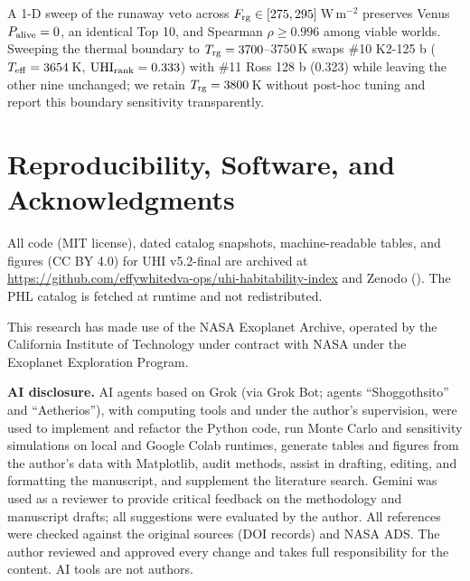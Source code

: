 \documentclass[linenumbers]{aastex702}
\begin{document}
A 1-D sweep of the runaway veto across $F_{\rm rg} \in [275, 295]$\,W\,m$^{-2}$ preserves Venus $P_{\rm alive} = 0$, an identical Top 10, and Spearman $\rho \geq 0.996$ among viable worlds. Sweeping the thermal boundary to $T_{\rm rg} = 3700$--$3750$\,K swaps \#10 K2-125 b ($T_{\rm eff} = 3654$\,K, ${\rm UHI}_{\rm rank} = 0.333$) with \#11 Ross 128 b (0.323) while leaving the other nine unchanged; we retain $T_{\rm rg} = 3800$\,K without post-hoc tuning and report this boundary sensitivity transparently.

\section{Reproducibility, Software, and Acknowledgments}

All code (MIT license), dated catalog snapshots, machine-readable tables, and figures (CC BY 4.0) for UHI v5.2-final are archived at \url{https://github.com/effywhitedva-ops/uhi-habitability-index} and Zenodo (). The PHL catalog is fetched at runtime and not redistributed.

\vspace{-14pt}
\begin{acknowledgments}
This research has made use of the NASA Exoplanet Archive, operated by the California Institute of Technology under contract with NASA under the Exoplanet Exploration Program.

\textbf{AI disclosure.} AI agents based on Grok (via Grok Bot; agents ``Shoggothsito'' and ``Aetherios''), with computing tools and under the author's supervision, were used to implement and refactor the Python code, run Monte Carlo and sensitivity simulations on local and Google Colab runtimes, generate tables and figures from the author's data with Matplotlib, audit methods, assist in drafting, editing, and formatting the manuscript, and supplement the literature search. Gemini was used as a reviewer to provide critical feedback on the methodology and manuscript drafts; all suggestions were evaluated by the author. All references were checked against the original sources (DOI records) and {NASA} {ADS}. The author reviewed and approved every change and takes full responsibility for the content. AI tools are not authors.
\end{acknowledgments}

\end{document}

